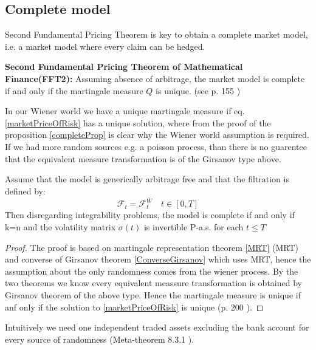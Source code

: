 \subsection{Complete model}
Second Fundamental Pricing Theorem is key to obtain a complete market model, i.e. a market model where every claim can be hedged.
\begin{theorem}\label{FFT2}
\textbf{Second Fundamental Pricing Theorem of Mathematical Finance(FFT2): } Assuming absence of arbitrage, the market model is complete if and only if the martingale measure $Q$ is unique.
(see p. 155 \parencite{finKont})
\end{theorem}
In our Wiener world we have a unique martingale measure if eq. \ref{marketPriceOfRisk} has a unique solution, where from the proof of the proposition \ref{completeProp} is clear why the Wiener world assumption is required. If we had more random sources e.g. a poisson process, than there is no guarentee that the equivalent measure transformation is of the Girsanov type above. 

\begin{proposition}{}\label{completeProp}
Assume that the model is generically arbitrage free and that the filtration is defined by:
$$\mathcal{F}_t=\mathcal{F}_t^{\bar{W}} \quad t \in [0,T]$$
Then disregarding integrability problems, the model is complete if and only if k=n and the volatility matrix $\sigma(t)$ is invertible P-a.s. for each $t \leq T$
\begin{proof}
The proof is based on martingale representation theorem \ref{MRT} (MRT) and converse of Girsanov theorem \ref{ConverseGirsanov} which uses MRT, hence the assumption about the only randomness comes from the wiener process. By the two theorems we know every equivalent meassure transformation is obtained by Girsanov theorem of the above type. Hence the martingale measure is unique if anf only if the solution to \eqref{marketPriceOfRisk} is unique (p. 200 \parencite{finKont}).                                         
\end{proof}
\end{proposition}
Intuitively we need one independent traded assets excluding the bank account for every source of randomness (Meta-theorem 8.3.1 \parencite{finKont}).


